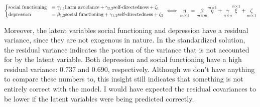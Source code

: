 \documentclass[11pt]{article}
\begin{document}
\begin{table}[h]
\vspace{0.2cm}
\begin{equation}
  \small
  \begin{cases}
    \textrm{social functioning} & = \gamma_{2,1} \textrm{harm avoidance}     + \gamma_{2,2} \textrm{self-directedness} + \zeta_1 \\
    \textrm{depression}         & = \beta_{1,2}  \textrm{social functioning} + \gamma_{1,2} \textrm{self-directedness} + \zeta_2 \\
  \end{cases}
  \iff
    \underset{m \times 1}{\eta} = \underset{m \times m}{\beta} \overset{m \times 1}{\eta}
                                  + \underset{n \times n}{\gamma} \overset{n \times 1}{\xi}
                                  + \underset{m \times 1}{\zeta} \\
\end{equation}
\vspace{0.2cm}
\captionsetup{singlelinecheck=off}\caption{Structural model}
\label{tab:base_structural}
\end{table}

Moreover, the latent variables social functioning and depression have a residual
variance, since they are not exogenous in nature. In the standardized solution,
the residual variance indicates the portion of the variance that is not
accounted for by the latent variable. Both depression and social functioning
have a high residual variance: 0.737 and 0.690, respectively. Although we don't
have anything to compare these numbers to, this insight still indicates that
something is not entirely correct with the model. I would have expected the
residual covariances to be lower if the latent variables were being predicted
correctly.
\end{document}
